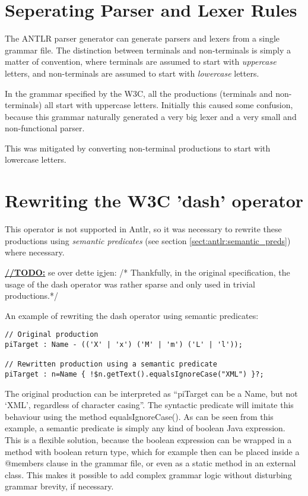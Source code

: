 \section{Seperating Parser and Lexer Rules}

The ANTLR parser generator can generate parsers and lexers from a single grammar
file. The distinction between terminals and non-terminals is simply a matter of
convention, where terminals are assumed to start with \emph{uppercase} letters,
and non-terminals are assumed to start with \emph{lowercase} letters.

In the grammar specified by the W3C, all the productions (terminals and
non-terminals) all start with uppercase letters. Initially this caused some
confusion, because this grammar naturally generated a very big lexer and a very
small and non-functional parser.

This was mitigated by converting non-terminal productions to start with
lowercase letters.


\section{Rewriting the W3C 'dash' operator}
This operator is not supported in Antlr, so it was necessary to rewrite
these productions using \emph{semantic predicates} (see section \ref{sect:antlr:semantic_preds}) where
necessary.

\underline{\textbf{\LARGE //TODO:}} se over dette igjen: /* Thankfully,
in the original specification, the usage of the dash operator was rather sparse
and only used in trivial productions.*/

An example of rewriting the dash operator using semantic predicates:
\begin{verbatim}
// Original production
piTarget : Name - (('X' | 'x') ('M' | 'm') ('L' | 'l'));

// Rewritten production using a semantic predicate
piTarget : n=Name { !$n.getText().equalsIgnoreCase("XML") }?;
\end{verbatim}
The original production can be interpreted as ``piTarget can be a Name, but not
`XML', regardless of character casing''. The syntactic predicate will imitate
this behaviour using the method equalsIgnoreCase(). As can be seen from this
example, a semantic predicate is simply any kind of boolean Java expression.
This is a flexible solution, because the boolean expression can be wrapped in a
method with boolean return type, which for example then can be placed inside a
@members { } clause in the grammar file, or even as a static method in an
external class. This makes it possible to add complex grammar logic without
disturbing grammar brevity, if necessary.


